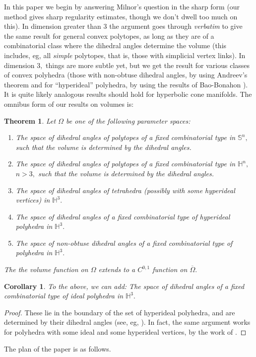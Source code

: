\documentclass[12pt]{amsart}
\newtheorem{theorem}{Theorem}
\newtheorem{corollary}{Corollary}
\theoremstyle{remark}
\begin{document}
In this paper we begin by answering Milnor's question in the sharp form (our
method gives sharp regularity estimates, though we don't dwell too much on this). In
dimension greater than $3$ the argument goes through \emph{verbatim} to give
the same result for general convex polytopes, as long as they are of a
combinatorial class where the dihedral angles determine the volume (this
includes, eg, all \emph{simple} polytopes, that is, those with simplicial
vertex links). In dimension $3,$ things are more subtle yet, but we get the
result for various classes of convex polyhedra (those with non-obtuse dihedral
angles, by using Andreev's theorem \cite{andreev1} and for ``hyperideal''
polyhedra, by using the results of Bao-Bonahon \cite{bbpoly}). It is quite
likely analogous results should hold for hyperbolic cone manifolds. 
The omnibus form of our results on volumes is:
\begin{theorem}
Let $\Omega$ be one of the following parameter spaces:
\begin{enumerate}
\item The space of dihedral angles of polytopes of a fixed combinatorial type
  in $\mathbb{S}^n,$ such that the volume is determined by the dihedral
  angles. 
\item The space of dihedral angles of polytopes of a fixed combinatorial type
  in $\mathbb{H}^n,$ $n > 3,$ such that the volume is determined by the
  dihedral angles. 
\item The space of dihedral angles of  tetrahedra (possibly with some
  hyperideal vertices) in $\mathbb{H}^3.$ 
\item The space of dihedral angles of a fixed combinatorial type of
  \emph{hyperideal} polyhedra in $\mathbb{H}^3.$ 
\item The space of \emph{non-obtuse} dihedral angles of a fixed combinatorial
  type of polyhedra in $\mathbb{H}^3.$ 
\end{enumerate}
The the volume function on $\Omega$ extends to a $C^{0,1}$ function on $\overline{\Omega}.$
\end{theorem}

\begin{corollary} To the above, we can add: The space of dihedral angles of a
  fixed combinatorial type of \emph{ideal} polyhedra in $\mathbb{H}^3.$ 
\end{corollary} 
\begin{proof} These lie in the boundary of the set of hyperideal polyhedra, and are determined by their dihedral angles (see, eg, \cite{ann2}). In fact, the same argument works for polyhedra with some ideal and some hyperideal vertices, by the work of \cite{bbpoly}.
\end{proof}
The plan of the paper is as follows. 
\end{document}
